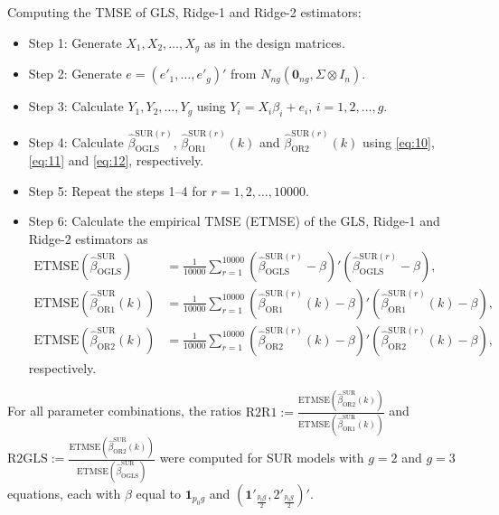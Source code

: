 \documentclass[twoside]{article}
\begin{document}
\begin{alg}\label{alg1}
Computing the TMSE of GLS, Ridge-1 and Ridge-2 estimators:
\begin{itemize}
\item Step 1: Generate $X_1, X_2, \ldots, X_g$ as in the design matrices.
\item Step 2: Generate $e = (e'_1, \ldots, e'_g)'$ from $N_{ng}(\mathbf{0}_{ng}, \Sigma \otimes I_n)$.
\item Step 3: Calculate $Y_1, Y_2, \ldots, Y_g$ using $Y_i = X_i\beta_i + e_i$, $i = 1, 2, \ldots, g$.
\item Step 4: Calculate $\hat{\beta}^{\text{SUR}(r)}_{\text{OGLS}}$, $\hat{\beta}^{\text{SUR}(r)}_{\text{OR1}}(k)$ and $\hat{\beta}^{\text{SUR}(r)}_{\text{OR2}}(k)$ using \eqref{eq:10}, \eqref{eq:11} and \eqref{eq:12}, respectively.
\item Step 5: Repeat the steps 1--4 for $r = 1, 2, \ldots, 10000$.
\item Step 6: Calculate the empirical TMSE (ETMSE) of the GLS, Ridge-1 and Ridge-2 estimators as
\begin{align}
\text{ETMSE}\left(\hat{\beta}^{\text{SUR}}_{\text{OGLS}}\right) &= \frac{1}{10000} \sum_{r=1}^{10000} \left(\hat{\beta}^{\text{SUR}(r)}_{\text{OGLS}} - \beta\right)' \left(\hat{\beta}^{\text{SUR}(r)}_{\text{OGLS}} - \beta\right), \\
\text{ETMSE}\left(\hat{\beta}^{\text{SUR}}_{\text{OR1}}(k)\right) &= \frac{1}{10000} \sum_{r=1}^{10000} \left(\hat{\beta}^{\text{SUR}(r)}_{\text{OR1}}(k) - \beta\right)' \left(\hat{\beta}^{\text{SUR}(r)}_{\text{OR1}}(k) - \beta\right), \\
\text{ETMSE}\left(\hat{\beta}^{\text{SUR}}_{\text{OR2}}(k)\right) &= \frac{1}{10000} \sum_{r=1}^{10000} \left(\hat{\beta}^{\text{SUR}(r)}_{\text{OR2}}(k) - \beta\right)' \left(\hat{\beta}^{\text{SUR}(r)}_{\text{OR2}}(k) - \beta\right),
\end{align}
respectively.
\end{itemize}
\end{alg}

For all parameter combinations, the ratios
$\text{R2R1} := \frac{\text{ETMSE}\left(\hat{\beta}^{\text{SUR}}_{\text{OR2}}(k)\right)}{\text{ETMSE}\left(\hat{\beta}^{\text{SUR}}_{\text{OR1}}(k)\right)}$ and $\text{R2GLS} := \frac{\text{ETMSE}\left(\hat{\beta}^{\text{SUR}}_{\text{OR2}}(k)\right)}{\text{ETMSE}\left(\hat{\beta}^{\text{SUR}}_{\text{OGLS}}\right)}$
were computed for SUR models with $g=2$ and $g=3$ equations, each with $\beta$ equal to $\mathbf{1}_{p_0 g}$ and $(\mathbf{1}'_{\frac{p_0 g}{2}}, 2'_{\frac{p_0 g}{2}})'$.
\end{document}
